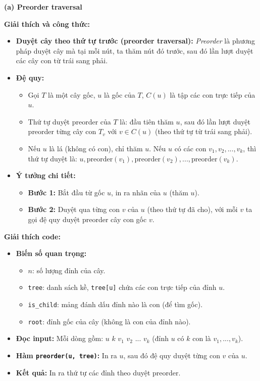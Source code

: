 \documentclass{article}
\begin{document}
\textbf{(a) Preorder traversal}

\textbf{Giải thích và công thức:}

\begin{itemize}
    \item \textbf{Duyệt cây theo thứ tự trước (preorder traversal):} \textit{Preorder} là phương pháp duyệt cây mà tại mỗi nút, ta thăm nút đó trước, sau đó lần lượt duyệt các cây con từ trái sang phải.
    \item \textbf{Đệ quy:}
    \begin{itemize}
        \item Gọi $T$ là một cây gốc, $u$ là gốc của $T$, $C(u)$ là tập các con trực tiếp của $u$.
        \item Thứ tự duyệt preorder của $T$ là: đầu tiên thăm $u$, sau đó lần lượt duyệt preorder từng cây con $T_v$ với $v \in C(u)$ (theo thứ tự từ trái sang phải).
        \item Nếu $u$ là lá (không có con), chỉ thăm $u$. Nếu $u$ có các con $v_1, v_2, ..., v_k$, thì thứ tự duyệt là: $u, \text{preorder}(v_1), \text{preorder}(v_2), ..., \text{preorder}(v_k)$.
    \end{itemize}
    \item \textbf{Ý tưởng chi tiết:}
    \begin{itemize}
        \item \textbf{Bước 1:} Bắt đầu từ gốc $u$, in ra nhãn của $u$ (thăm $u$).
        \item \textbf{Bước 2:} Duyệt qua từng con $v$ của $u$ (theo thứ tự đã cho), với mỗi $v$ ta gọi đệ quy duyệt preorder cây con gốc $v$.
    \end{itemize}
\end{itemize}

\textbf{Giải thích code:}

\begin{itemize}
    \item \textbf{Biến số quan trọng:}
    \begin{itemize}
        \item $n$: số lượng đỉnh của cây.
        \item \texttt{tree}: danh sách kề, \texttt{tree[u]} chứa các con trực tiếp của đỉnh $u$.
        \item \texttt{is\_child}: mảng đánh dấu đỉnh nào là con (để tìm gốc).
        \item \texttt{root}: đỉnh gốc của cây (không là con của đỉnh nào).
    \end{itemize}
    \item \textbf{Đọc input:} Mỗi dòng gồm: $u$ $k$ $v_1$ $v_2$ ... $v_k$ (đỉnh $u$ có $k$ con là $v_1, ..., v_k$).
    \item \textbf{Hàm \texttt{preorder(u, tree)}:} In ra $u$, sau đó đệ quy duyệt từng con $v$ của $u$.
    \item \textbf{Kết quả:} In ra thứ tự các đỉnh theo duyệt preorder.
\end{itemize}
\end{document}
